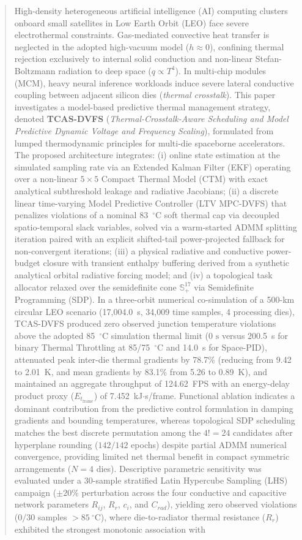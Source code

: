 \documentclass[a4paper,fleqn]{cas-dc}
\begin{document}
\begin{abstract}
High-density heterogeneous artificial intelligence (AI) computing clusters onboard small satellites in Low Earth Orbit (LEO) face severe electrothermal constraints. Gas-mediated convective heat transfer is neglected in the adopted high-vacuum model ($h \approx 0$), confining thermal rejection exclusively to internal solid conduction and non-linear Stefan-Boltzmann radiation to deep space ($q \propto T^4$). In multi-chip modules (MCM), heavy neural inference workloads induce severe lateral conductive coupling between adjacent silicon dies (\textit{thermal crosstalk}). This paper investigates a model-based predictive thermal management strategy, denoted \textbf{TCAS-DVFS} (\textit{Thermal-Crosstalk-Aware Scheduling and Model Predictive Dynamic Voltage and Frequency Scaling}), formulated from lumped thermodynamic principles for multi-die spaceborne accelerators. The proposed architecture integrates: (i) online state estimation at the simulated sampling rate via an Extended Kalman Filter (EKF) operating over a non-linear $5\times5$ Compact Thermal Model (CTM) with exact analytical subthreshold leakage and radiative Jacobians; (ii) a discrete linear time-varying Model Predictive Controller (LTV MPC-DVFS) that penalizes violations of a nominal 83~$^\circ$C soft thermal cap via decoupled spatio-temporal slack variables, solved via a warm-started ADMM splitting iteration paired with an explicit shifted-tail power-projected fallback for non-convergent iterations; (iii) a physical radiative and conductive power-budget closure with transient enthalpy buffering derived from a synthetic analytical orbital radiative forcing model; and (iv) a topological task allocator relaxed over the semidefinite cone $\mathbb{S}_+^{17}$ via Semidefinite Programming (SDP). In a three-orbit numerical co-simulation of a 500-km circular LEO scenario (17,004.0~s, 34,009 time samples, 4 processing dies), TCAS-DVFS produced zero observed junction temperature violations above the adopted 85~$^\circ$C simulation thermal limit ($0\text{ s}$ versus 200.5~s for binary Thermal Throttling at 85/75~$^\circ$C and 14.0~s for Space-PID), attenuated peak inter-die thermal gradients by 78.7\% (reducing from 9.42 to 2.01~K, and mean gradients by 83.1\% from 5.26 to 0.89~K), and maintained an aggregate throughput of 124.62~FPS with an energy-delay product proxy ($E_{t_{\mathrm{frame}}}$) of 7.452~kJ$\cdot$s/frame. Functional ablation indicates a dominant contribution from the predictive control formulation in damping gradients and bounding temperatures, whereas topological SDP scheduling matches the best discrete permutation among the $4! = 24$ candidates after hyperplane rounding ($142/142$ epochs) despite partial ADMM numerical convergence, providing limited net thermal benefit in compact symmetric arrangements ($N=4$ dies). Descriptive parametric sensitivity was evaluated under a 30-sample stratified Latin Hypercube Sampling (LHS) campaign ($\pm20\%$ perturbation across the four conductive and capacitive network parameters $R_{ij}$, $R_r$, $c_i$, and $C_{rad}$), yielding zero observed violations ($0/30$ samples $>85~^\circ$C), where die-to-radiator thermal resistance ($R_r$) exhibited the strongest monotonic association with 
\end{abstract}
\end{document}
